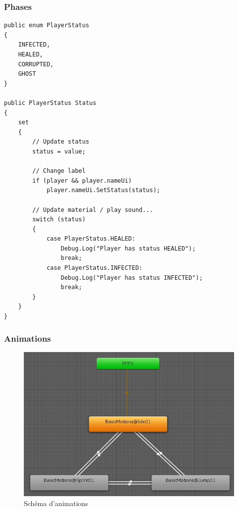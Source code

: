 \documentclass{article}
\begin{document}
\subsubsection{Phases}
\label{PhaseA}
\begin{lstlisting}
public enum PlayerStatus
{
    INFECTED,
    HEALED,
    CORRUPTED,
    GHOST
}

public PlayerStatus Status
{
    set
    {
        // Update status
        status = value;

        // Change label
        if (player && player.nameUi)
            player.nameUi.SetStatus(status);

        // Update material / play sound...
        switch (status)
        {
            case PlayerStatus.HEALED:
                Debug.Log("Player has status HEALED");
                break;
            case PlayerStatus.INFECTED:
                Debug.Log("Player has status INFECTED");
                break;
        }
    }
}
\end{lstlisting}

\subsubsection{Animations}
\label{Animations}

\begin{figure}[h]
	\includegraphics[width=1\textwidth]{anim.jpg}
	\caption{Schéma d'animations}
\end{figure}
\end{document}
